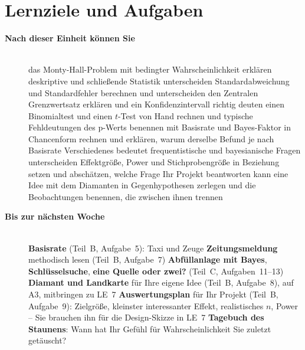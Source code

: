 \section{Lernziele und Aufgaben}
\begin{description}
\item[{\rot\bf Nach dieser Einheit können Sie}]~\\[-\lblskip]
\bi
  \ite das Monty-Hall-Problem mit bedingter Wahrscheinlichkeit erklären
  \ite deskriptive und schließende Statistik unterscheiden
  \ite Standardabweichung und Standardfehler berechnen und
    unterscheiden
  \ite den Zentralen Grenzwertsatz erklären und ein Konfidenzintervall
    richtig deuten
  \ite einen Binomialtest und einen $t$-Test von Hand rechnen und
    typische Fehldeutungen des p-Werts benennen
  \ite mit Basisrate und Bayes-Faktor in Chancenform rechnen und
    erklären, warum derselbe Befund je nach Basisrate Verschiedenes
    bedeutet
  \ite frequentistische und bayesianische Fragen unterscheiden
  \ite Effektgröße, Power und Stichprobengröße in Beziehung setzen und
    abschätzen, welche Frage Ihr Projekt beantworten kann
  \ite eine Idee mit dem Diamanten in Gegenhypothesen zerlegen und die
    Beobachtungen benennen, die zwischen ihnen trennen
\ei
\os{\newpage}

\item[{\rot\bf Bis zur nächsten Woche}]~\\[-\lblskip]
\bi
  \ite \textbf{Basisrate} (Teil~B, Aufgabe~5): Taxi und Zeuge
  \ite \textbf{Zeitungsmeldung} methodisch lesen (Teil~B, Aufgabe~7)
  \ite \textbf{Abfüllanlage mit Bayes}, \textbf{Schlüsselsuche},
    \textbf{eine Quelle oder zwei?} (Teil~C, Aufgaben~11--13)
  \ite \textbf{Diamant und Landkarte} für Ihre eigene Idee (Teil~B,
    Aufgabe~8), auf A3, mitbringen zu LE~7
  \ite \textbf{Auswertungsplan} für Ihr Projekt (Teil~B, Aufgabe~9):
    Zielgröße, kleinster interessanter Effekt, realistisches $n$, Power
    -- Sie brauchen ihn für die Design-Skizze in LE~7
  \ite \textbf{Tagebuch des Staunens}: Wann hat Ihr Gefühl für
    Wahrscheinlichkeit Sie zuletzt getäuscht?
\ei
\os{\newpage}
\end{description}


